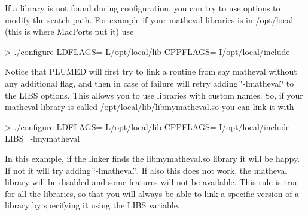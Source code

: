 If a library is not found during configuration, you can try to use options to modify the seatch path. For example if your matheval libraries is in /opt/local (this is where Mac\+Ports put it) use \begin{DoxyVerb}> ./configure LDFLAGS=-L/opt/local/lib CPPFLAGS=-I/opt/local/include
\end{DoxyVerb}
 Notice that P\+L\+U\+M\+E\+D will first try to link a routine from say matheval without any additional flag, and then in case of failure will retry adding \char`\"{}-\/lmatheval\char`\"{} to the L\+I\+B\+S options. This allows you to use libraries with custom names. So, if your matheval library is called /opt/local/lib/libmymatheval.so you can link it with \begin{DoxyVerb}> ./configure LDFLAGS=-L/opt/local/lib CPPFLAGS=-I/opt/local/include LIBS=-lmymatheval
\end{DoxyVerb}
 In this example, if the linker finds the libmymatheval.\+so library it will be happy. If not it will try adding \char`\"{}-\/lmatheval\char`\"{}. If also this does not work, the matheval library will be disabled and some features will not be available. This rule is true for all the libraries, so that you will always be able to link a specific version of a library by specifying it using the L\+I\+B\+S variable.

